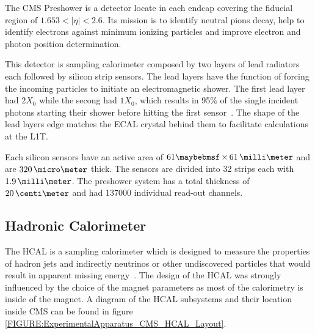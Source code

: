 
The \gls{CMS} Preshower is a detector locate in each endcap covering the fiducial region of $1.653<|\eta|<2.6$. Its mission is to identify neutral pions decay, help to identify electrons against minimum ionizing particles and improve electron and photon position determination.

This detector is sampling calorimeter composed by two layers of lead radiators each followed by silicon strip sensors. The lead layers have the function of forcing the incoming particles to initiate an electromagnetic shower. The first lead layer had $2X_0$ while the secong had $1X_0$, which results in 95\% of the single incident photons starting their shower before hitting the first sensor~\cite{ARTICLE:TheCMSExperiment}. The shape of the lead layers edge matches the \gls{ECAL} crystal behind them to facilitate calculations at the \gls{L1T}.

Each silicon sensors have an active area of $61 \times 61\,\milli\meter$ and are $320\,\micro\meter$ thick. The sensors are divided into 32 strips each with $1.9\,\milli\meter$.  The preshower system has a total thickness of $20\,\centi\meter$ and had 137000 individual read-out channels. 

\subsection{Hadronic Calorimeter}
\label{SUBSECTION:ExperimentalApparatus_CMS_HCAL}


The \acrfull{HCAL} is a sampling calorimeter which is designed to measure the properties of hadron jets and indirectly neutrinos or other undiscovered particles that would result in apparent missing energy~\cite{CMSTDR:CMSHCAL}. The design of the \gls{HCAL} was strongly influenced by the choice of the magnet parameters as most of the calorimetry is inside of the magnet. A diagram of the \gls{HCAL} subsystems and their location inside \gls{CMS} can be found in figure \ref{FIGURE:ExperimentalApparatus_CMS_HCAL_Layout}.

